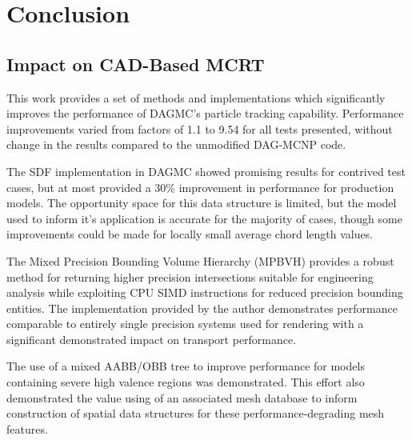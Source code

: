 
\chapter{Conclusion}\label{ch:conclusion}

\section{Impact on CAD-Based MCRT}

This work provides a set of methods and implementations which significantly
improves the performance of DAGMC's particle tracking
capability. Performance improvements varied from factors of 1.1 to
9.54 for all tests presented, without change in the results compared to the
unmodified DAG-MCNP code. 

The SDF implementation in DAGMC showed promising results for contrived test
cases, but at most provided a 30\% improvement in performance for production
models. The opportunity space for this data structure is limited, but the model
used to inform it's application is accurate for the majority of cases,
though some improvements could be made for locally small average chord length
values.

The Mixed Precision Bounding Volume Hierarchy (MPBVH) provides a robust method
for returning higher precision intersections suitable for engineering analysis
while exploiting CPU SIMD instructions for reduced precision bounding
entities. The implementation provided by the author demonstrates performance
comparable to entirely single precision systems used for rendering with a
significant demonstrated impact on transport performance.

The use of a mixed AABB/OBB tree to improve performance for models containing
severe high valence regions was demonstrated. This effort also demonstrated the
value using of an associated mesh database to inform construction of spatial
data structures for these performance-degrading mesh features.

